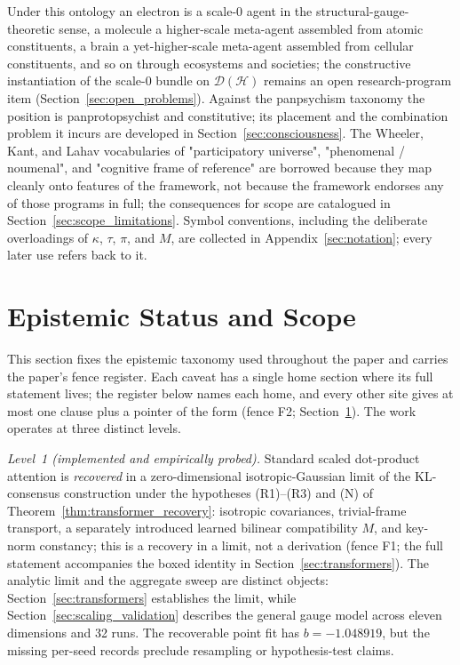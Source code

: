 \documentclass[11pt]{article}
\begin{document}
Under this ontology an electron is a scale-0 agent in the structural-gauge-theoretic sense, a molecule a higher-scale meta-agent assembled from atomic constituents, a brain a yet-higher-scale meta-agent assembled from cellular constituents, and so on through ecosystems and societies; the constructive instantiation of the scale-0 bundle on $\mathcal{D}(\mathcal{H})$ remains an open research-program item (Section~\ref{sec:open_problems}). Against the panpsychism taxonomy the position is panprotopsychist and constitutive; its placement and the combination problem it incurs are developed in Section~\ref{sec:consciousness}. The Wheeler, Kant, and Lahav vocabularies of "participatory universe", "phenomenal / noumenal", and "cognitive frame of reference" are borrowed because they map cleanly onto features of the framework, not because the framework endorses any of those programs in full; the consequences for scope are catalogued in Section~\ref{sec:scope_limitations}. Symbol conventions, including the deliberate overloadings of $\kappa$, $\tau$, $\pi$, and $M$, are collected in Appendix~\ref{sec:notation}; every later use refers back to it.

\section{Epistemic Status and Scope}\label{sec:epistemic_status}

This section fixes the epistemic taxonomy used throughout the paper and carries the paper's fence register. Each caveat has a single home section where its full statement lives; the register below names each home, and every other site gives at most one clause plus a pointer of the form (fence F2; Section~\ref{sec:epistemic_status}). The work operates at three distinct levels.

\emph{Level~1 (implemented and empirically probed).} Standard scaled dot-product attention is \emph{recovered} in a zero-dimensional isotropic-Gaussian limit of the KL-consensus construction under the hypotheses (R1)--(R3) and (N) of Theorem~\ref{thm:transformer_recovery}: isotropic covariances, trivial-frame transport, a separately introduced learned bilinear compatibility $M$, and key-norm constancy; this is a recovery in a limit, not a derivation (fence F1; the full statement accompanies the boxed identity in Section~\ref{sec:transformers}). The analytic limit and the aggregate sweep are distinct objects: Section~\ref{sec:transformers} establishes the limit, while Section~\ref{sec:scaling_validation} describes the general gauge model across eleven dimensions and 32 runs. The recoverable point fit has $b=-1.048919$, but the missing per-seed records preclude resampling or hypothesis-test claims.
\end{document}
